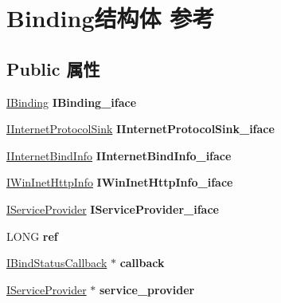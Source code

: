 \hypertarget{struct_binding}{}\section{Binding结构体 参考}
\label{struct_binding}
\subsection*{Public 属性}
\begin{DoxyCompactItemize}
\item 
\mbox{\label{struct_binding_ac98c7df3ab410a3e6155670cc83f1d07}} 
\hyperlink{interface_i_binding}{I\+Binding} {\bfseries I\+Binding\+\_\+iface}
\item 
\mbox{\label{struct_binding_ad30a66a0df1158b471489354db744404}} 
\hyperlink{interface_i_internet_protocol_sink}{I\+Internet\+Protocol\+Sink} {\bfseries I\+Internet\+Protocol\+Sink\+\_\+iface}
\item 
\mbox{\label{struct_binding_a55de575b9d78cf32aa161aff8b83a497}} 
\hyperlink{interface_i_internet_bind_info}{I\+Internet\+Bind\+Info} {\bfseries I\+Internet\+Bind\+Info\+\_\+iface}
\item 
\mbox{\label{struct_binding_ac4a7d3405796ec87543fbe2579363deb}} 
\hyperlink{interface_i_win_inet_http_info}{I\+Win\+Inet\+Http\+Info} {\bfseries I\+Win\+Inet\+Http\+Info\+\_\+iface}
\item 
\mbox{\label{struct_binding_abf76b635fadc932e7fd9ec6869550d5e}} 
\hyperlink{interface_i_service_provider}{I\+Service\+Provider} {\bfseries I\+Service\+Provider\+\_\+iface}
\item 
\mbox{\label{struct_binding_a1eaecf985398794b2ffc84237352f1b3}} 
L\+O\+NG {\bfseries ref}
\item 
\mbox{\label{struct_binding_a54948074503106fe8d961dd8e16742a7}} 
\hyperlink{interface_i_bind_status_callback}{I\+Bind\+Status\+Callback} $\ast$ {\bfseries callback}
\item 
\mbox{\label{struct_binding_a4c2768f321fbf03b3545b9821ca7f5b7}} 
\hyperlink{interface_i_service_provider}{I\+Service\+Provider} $\ast$ {\bfseries service\+\_\+provider}

\end{DoxyCompactItemize}

